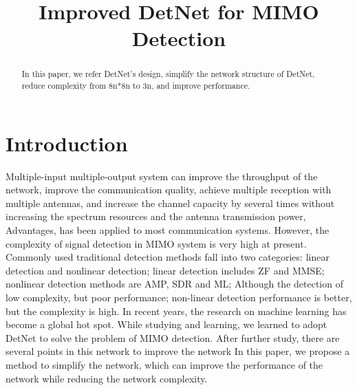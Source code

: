 \documentclass[conference]{IEEEtran}
\begin{document}
\title{Improved DetNet for MIMO Detection}

\author{
}

\maketitle
\begin{abstract}
In this paper, we refer DetNet\cite{DetNet}'s design, simplify the network structure of DetNet, reduce complexity from 8n*8n to 3n, and improve performance.

\end{abstract}

\IEEEpeerreviewmaketitle

\section{Introduction}
Multiple-input multiple-output system can improve the throughput of the network, improve the communication quality, achieve multiple reception with multiple antennas, and increase the channel capacity by several times without increasing the spectrum resources and the antenna transmission power, Advantages, has been applied to most communication systems. However, the complexity of signal detection in MIMO system is very high at present. Commonly used traditional detection methods fall into two categories: linear detection and nonlinear detection; linear detection includes ZF and MMSE; nonlinear detection methods are AMP, SDR and ML; Although the detection of low complexity, but poor performance; non-linear detection performance is better, but the complexity is high. In recent years, the research on machine learning has become a global hot spot. While studying and learning, we learned to adopt DetNet to solve the problem of MIMO detection. After further study, there are several points in this network to improve the network In this paper, we propose a method to simplify the network, which can improve the performance of the network while reducing the network complexity.
\end{document}
